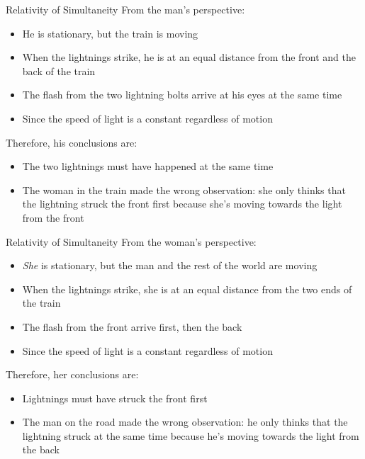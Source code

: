 \documentclass[12pt,compress,aspectratio=169]{beamer}
\begin{document}
\begin{frame}{Relativity of Simultaneity}
  From the man's perspective:
  \begin{itemize}
  \item He is stationary, but the train is moving
  \item When the lightnings strike, he is at an equal distance from the front
    and the back of the train
  \item The flash from the two lightning bolts arrive at his eyes at the same
    time
  \item Since the speed of light is a constant regardless of motion
  \end{itemize}
  Therefore, his conclusions are:
  \begin{itemize}
  \item The two lightnings must have happened at the same time
  \item The woman in the train made the wrong observation: she only thinks that
    the lightning struck the front first because she's moving towards the light
    from the front
  \end{itemize}
\end{frame}


\begin{frame}{Relativity of Simultaneity}
  From the woman's perspective:
  \begin{itemize}
  \item\emph{She} is stationary, but the man and the rest of the world are
    moving
  \item When the lightnings strike, she is at an equal distance from the two
    ends of the train
  \item The flash from the front arrive first, then the back
  \item Since the speed of light is a constant regardless of motion
  \end{itemize}
  Therefore, her conclusions are:
  \begin{itemize}
  \item Lightnings must have struck the front first
  \item The man on the road made the wrong observation: he only thinks that
    the lightning struck at the same time because he's moving towards the light
    from the back
  \end{itemize}
\end{frame}
\end{document}
